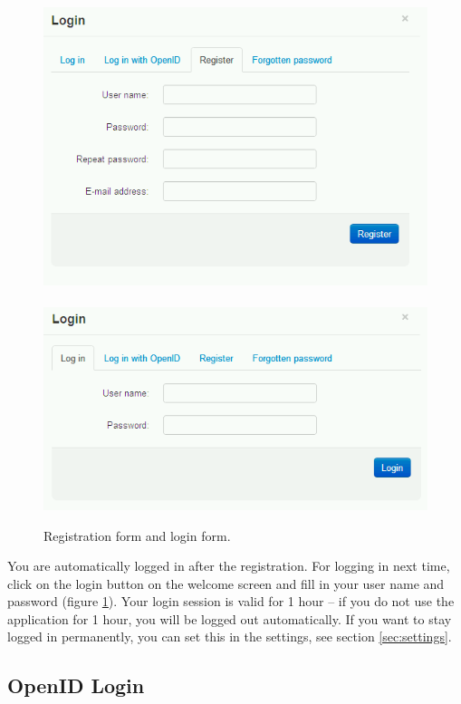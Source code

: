 \begin{figure}[h]
\begin{center}
\includegraphics[scale=0.4]{figures/user_manual/register.png}~~~~\includegraphics[scale=0.4]{figures/user_manual/login.png}
\end{center}
\caption{Registration form and login form.}
\label{fig:register_login}
\end{figure}

You are automatically logged in after the registration. For logging in next time, click on the login button on the welcome screen and fill in your user name and password (figure \ref{fig:register_login}). Your login session is valid for 1 hour -- if you do not use the application for 1 hour, you will be logged out automatically. If you want to stay logged in permanently, you can set this in the settings, see section \ref{sec:settings}.

\subsection{OpenID Login}

